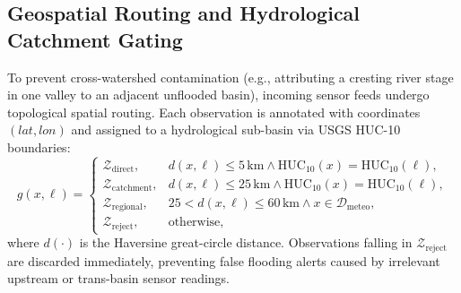 \documentclass[conference]{IEEEtran}
\begin{document}
\subsection{Geospatial Routing and Hydrological Catchment Gating}
To prevent cross-watershed contamination (e.g., attributing a cresting river stage in one valley to an adjacent unflooded basin), incoming sensor feeds undergo topological spatial routing. Each observation is annotated with coordinates $(lat, lon)$ and assigned to a hydrological sub-basin via USGS HUC-10 boundaries:
\begin{equation}
g(x, \ell) = \begin{cases}
\mathcal{Z}_{\mathrm{direct}}, & d(x, \ell) \le 5\,\text{km} \land \mathrm{HUC}_{10}(x) = \mathrm{HUC}_{10}(\ell),\\
\mathcal{Z}_{\mathrm{catchment}}, & d(x, \ell) \le 25\,\text{km} \land \mathrm{HUC}_{10}(x) = \mathrm{HUC}_{10}(\ell),\\
\mathcal{Z}_{\mathrm{regional}}, & 25 < d(x, \ell) \le 60\,\text{km} \land x \in \mathcal{D}_{\mathrm{meteo}},\\
\mathcal{Z}_{\mathrm{reject}}, & \text{otherwise},
\end{cases}
\label{eq:geo_gate}
\end{equation}
where $d(\cdot)$ is the Haversine great-circle distance. Observations falling in $\mathcal{Z}_{\mathrm{reject}}$ are discarded immediately, preventing false flooding alerts caused by irrelevant upstream or trans-basin sensor readings.
\end{document}

